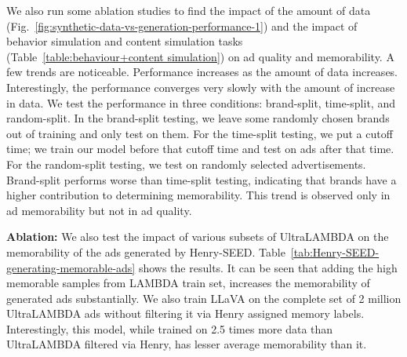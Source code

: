 We also run some ablation studies to find the impact of the amount of data (Fig.~\ref{fig:synthetic-data-vs-generation-performance-1}) and the impact of behavior simulation and content simulation tasks (Table~\ref{table:behaviour+content simulation}) on ad quality and memorability. A few trends are noticeable. Performance increases as the amount of data increases. Interestingly, the performance converges very slowly with the amount of increase in data. We test the performance in three conditions: brand-split, time-split, and random-split. In the brand-split testing, we leave some randomly chosen brands out of training and only test on them. For the time-split testing, we put a cutoff time; we train our model before that cutoff time and test on ads after that time. For the random-split testing, we test on randomly selected advertisements. Brand-split performs worse than time-split testing, indicating that brands have a higher contribution to determining memorability. This trend is observed only in ad memorability but not in ad quality. 

\textbf{Ablation:} We also test the impact of various subsets of UltraLAMBDA on the memorability of the ads generated by Henry-SEED. Table~\ref{tab:Henry-SEED-generating-memorable-ads} shows the results. It can be seen that adding the high memorable samples from LAMBDA train set, increases the memorability of generated ads substantially. We also train LLaVA on the complete set of 2 million UltraLAMBDA ads without filtering it via Henry assigned memory labels. Interestingly, this model, while trained on 2.5 times more data than UltraLAMBDA filtered via Henry, has lesser average memorability than it.




\begin{table}[!h]
    \caption{\textbf{Ad Generation}: Perplexity comparison (refer \S\ref{sec:Perplexity evaluation}) of LLaVA and Henry-SEED on low/medium/high memorable ads from LAMBDA test set. We see that untrained LLaVA does not favor memorable ads. Further, we note that when synthetic data is included during training, the ratio of perplexity on low and high ads grows from 2.79 to 3.01.}
    \label{table:perplexity-scores-ultralamda}
\end{table}

